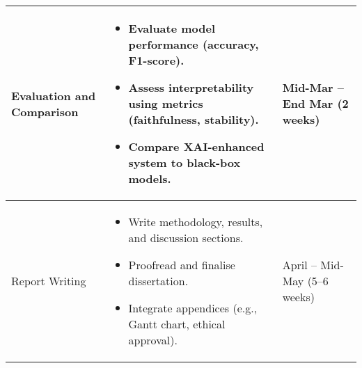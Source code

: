 \begin{longtable}{|p{5cm}|p{6cm}|p{4cm}|}
Evaluation and Comparison & 
\begin{itemize}
    \item Evaluate model performance (accuracy, F1-score).
    \item Assess interpretability using metrics (faithfulness, stability).
    \item Compare XAI-enhanced system to black-box models.
\end{itemize} & 
Mid-Mar -- End Mar (2 weeks) \\
\hline

Report Writing & 
\begin{itemize}
    \item Write methodology, results, and discussion sections.
    \item Proofread and finalise dissertation.
    \item Integrate appendices (e.g., Gantt chart, ethical approval).
\end{itemize} & 
April -- Mid-May (5--6 weeks) \\
\hline

\end{longtable}
